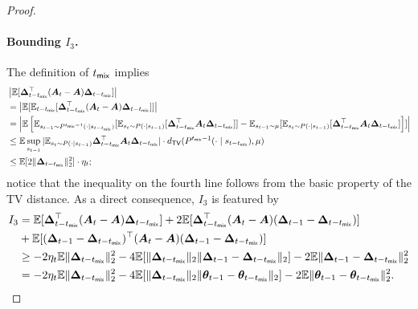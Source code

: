 \begin{proof}
\paragraph{Bounding $I_3$.} The definition of $t_{\mathsf{mix}}$ implies
\begin{align*}
&\left|\mathbb{E}[\bm{\Delta}_{t-t_{\mathsf{mix}}}^\top (\bm{A}_t - \bm{A})\bm{\Delta}_{t-t_{\mathsf{mix}}}]\right|\\
&= \left|\mathbb{E}[\mathbb{E}_{t-t_{\mathsf{mix}}}[\bm{\Delta}_{t-t_{\mathsf{mix}}}^\top (\bm{A}_t - \bm{A})\bm{\Delta}_{t-t_{\mathsf{mix}}}]]\right| \\ 
&= \left|\mathbb{E} \left[\mathbb{E}_{s_{t-1} \sim P^{t_{\mathsf{mix}}-1}(\cdot \mid s_{t-t_{\mathsf{mix}}})}[\mathbb{E}_{s_t \sim P(\cdot \mid s_{t-1})}[\bm{\Delta}_{t-t_{\mathsf{mix}}}^\top\bm{A}_t \bm{\Delta}_{t-t_{\mathsf{mix}}}]] - \mathbb{E}_{s_{t-1} \sim \mu}[\mathbb{E}_{s_t \sim P(\cdot \mid s_{t-1})}[\bm{\Delta}_{t-t_{\mathsf{mix}}}^\top\bm{A}_t \bm{\Delta}_{t-t_{\mathsf{mix}}}]  \right]] \right|\\ 
&\leq \mathbb{E}\sup_{s_{t-1}} |\mathbb{E}_{s_t \sim P(\cdot \mid s_{t-1})}\bm{\Delta}_{t-t_{\mathsf{mix}}}^\top\bm{A}_t \bm{\Delta}_{t-t_{\mathsf{mix}}}| \cdot d_{\mathsf{TV}}(P^{t_{\mathsf{mix}}-1}(\cdot \mid s_{t-t_{\mathsf{mix}}}),\mu) \\ 
&\leq \mathbb{E}[2\|\bm{\Delta}_{t - t_{\mathsf{mix}}}\|_2^2 ] \cdot \eta_t;
\end{align*}
notice that the inequality on the fourth line follows from the basic property of the TV distance.
As a direct consequence, $I_3$ is featured by %
\begin{align*}
I_3 &= \mathbb{E}[\bm{\Delta}_{t-t_{\mathsf{mix}}}^\top (\bm{A}_t - \bm{A})\bm{\Delta}_{t-t_{\mathsf{mix}}}] + 2\mathbb{E}[\bm{\Delta}_{t-t_{\mathsf{mix}}}^\top (\bm{A}_t - \bm{A})(\bm{\Delta}_{t-1} - \bm{\Delta}_{t-t_{\mathsf{mix}}})] \\ 
&+ \mathbb{E}[(\bm{\Delta}_{t-1} - \bm{\Delta}_{t-t_{\mathsf{mix}}})^\top (\bm{A}_t - \bm{A})(\bm{\Delta}_{t-1} - \bm{\Delta}_{t-t_{\mathsf{mix}}})] \\ 
&\geq -2\eta_t\mathbb{E}\|\bm{\Delta}_{t-t_{\mathsf{mix}}}\|_2^2 -4 \mathbb{E}[\|\bm{\Delta}_{t-t_{\mathsf{mix}}}\|_2\|\bm{\Delta}_{t-1} - \bm{\Delta}_{t-t_{\mathsf{mix}}}\|_2]-2 \mathbb{E}\|\bm{\Delta}_{t-1} - \bm{\Delta}_{t-t_{\mathsf{mix}}}\|_2^2 \\ 
&= -2\eta_t\mathbb{E}\|\bm{\Delta}_{t-t_{\mathsf{mix}}}\|_2^2 -4 \mathbb{E}[\|\bm{\Delta}_{t-t_{\mathsf{mix}}}\|_2\|\bm{\theta}_{t-1} - \bm{\theta}_{t-t_{\mathsf{mix}}}\|_2]-2 \mathbb{E}\|\bm{\theta}_{t-1} - \bm{\theta}_{t-t_{\mathsf{mix}}}\|_2^2.
\end{align*}

\end{proof}
